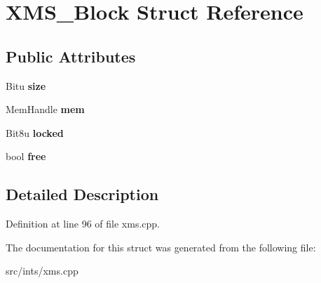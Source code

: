\hypertarget{structXMS__Block}{\section{X\-M\-S\-\_\-\-Block Struct Reference}
\label{structXMS__Block}
}
\subsection*{Public Attributes}
\begin{DoxyCompactItemize}
\item 
\hypertarget{structXMS__Block_ac64ef7bd634fd3b0e71b2f712ce9ad74}{Bitu {\bfseries size}}\label{structXMS__Block_ac64ef7bd634fd3b0e71b2f712ce9ad74}

\item 
\hypertarget{structXMS__Block_a40362265a08f53dde89854249f3e4b2d}{Mem\-Handle {\bfseries mem}}\label{structXMS__Block_a40362265a08f53dde89854249f3e4b2d}

\item 
\hypertarget{structXMS__Block_aeca5b88beebe3eaa694386c0b04405bf}{Bit8u {\bfseries locked}}\label{structXMS__Block_aeca5b88beebe3eaa694386c0b04405bf}

\item 
\hypertarget{structXMS__Block_a362599c2a44039cd152780f6f46a9023}{bool {\bfseries free}}\label{structXMS__Block_a362599c2a44039cd152780f6f46a9023}

\end{DoxyCompactItemize}


\subsection{Detailed Description}


Definition at line 96 of file xms.\-cpp.



The documentation for this struct was generated from the following file\-:\begin{DoxyCompactItemize}
\item 
src/ints/xms.\-cpp\end{DoxyCompactItemize}
